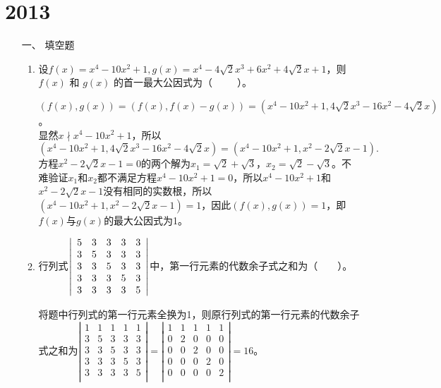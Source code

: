\section{2013}
\begin{enumerate}[1~]
\renewcommand{\labelenumi}{\textbf{\theenumi. }}
\renewcommand{\Im}{\text{Im }}
\item[一、]填空题 
\begin{enumerate}[1.~]
\item
设$f ( x ) = x ^ { 4 } - 10 x ^ { 2 } + 1 ,  g ( x ) = x ^ { 4 } - 4 \sqrt { 2 } x ^ { 3 } + 6 x ^ { 2 } + 4 \sqrt { 2 } x + 1$，则 $f(x)$ 和 $g(x)$ 的首一最大公因式为（\ \ \ \ \ ）。
\begin{solution}
$(f(x), g(x)) = (f(x), f(x)-g(x)) = (x^4 - 10x^2 +1, 4\sqrt{2} x^3-16 x^2-4\sqrt{2}x)$。\\
显然$x \nmid x^4-10x^2 +1$，所以\[
(x^4 -10x^2+1, 4 \sqrt { 2 } x ^ { 3 } -1 6 x ^ { 2 } - 4 \sqrt { 2 } x ) = (x^4 -10x^2+1,  x ^ { 2 } - 2 \sqrt { 2 } x -1 ). \]
方程$x^2 -2\sqrt{2}x -1 = 0$的两个解为$x_1 = \sqrt{2}+\sqrt{3}$，$x_2 = \sqrt{2} -\sqrt{3}$。不难验证$x_1$和$x_2$都不满足方程$x^4-10x^2+1 = 0$，所以$x^4-10x^2+1$和$x^2-2\sqrt{2}x-1$没有相同的实数根，所以$(x^4-10x^2+1, x^2-2\sqrt{2}x-1) = 1$，因此$(f(x), g(x)) = 1$，即$f(x)$与$g(x)$的最大公因式为1。
\end{solution}

\item 
行列式$\left| \begin{array} { c c c c c } { 5 } & { 3 } & { 3 } & { 3 } & { 3 } \\ { 3 } & { 5 } & { 3 } & { 3 } & { 3 } \\ { 3 } & { 3 } & { 5 } & { 3 } & { 3 } \\ { 3 } & { 3 } & { 3 } & { 5 } & { 3 } \\ { 3 } & { 3 } & { 3 } & { 3 } & { 5 } \end{array} \right|$中，第一行元素的代数余子式之和为（\ \ \ \ ）。
\begin{solution}
将题中行列式的第一行元素全换为1，则原行列式的第一行元素的代数余子式之和为$\left| \begin{matrix}
	1&		1&		1&		1&		1\\
	3&		5&		3&		3&		3\\
	3&		3&		5&		3&		3\\
	3&		3&		3&		5&		3\\
	3&		3&		3&		3&		5\\
\end{matrix} \right|=\left| \begin{matrix}
	1&		1&		1&		1&		1\\
	0&		2&		0&		0&		0\\
	0&		0&		2&		0&		0\\
	0&		0&		0&		2&		0\\
	0&		0&		0&		0&		2\\
\end{matrix} \right|=16$。
\end{solution}


\end{enumerate}
\end{enumerate}
